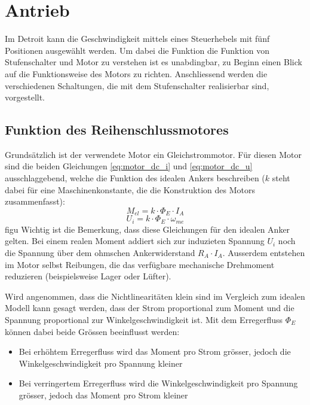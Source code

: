 \section{Antrieb}

Im Detroit kann die Geschwindigkeit mittels eines Steuerhebels mit fünf Positionen ausgewählt werden. Um dabei die Funktion die Funktion von Stufenschalter und Motor zu verstehen ist es unabdingbar, zu Beginn einen Blick auf die Funktionsweise des Motors zu richten. Anschliessend werden die verschiedenen Schaltungen, die mit dem Stufenschalter realisierbar sind, vorgestellt.

\subsection{Funktion des Reihenschlussmotores}\label{gm}

Grundsätzlich ist der verwendete Motor ein Gleichstrommotor. Für diesen Motor sind die beiden Gleichungen \ref{eq:motor_dc_i} und \ref{eq:motor_dc_u} ausschlaggebend, welche die Funktion des idealen Ankers beschreiben ($k$ steht dabei für eine Maschinenkonstante, die die Konstruktion des Motors zusammenfasst):
\begin{equation}
	M_{el}=k\cdot\Phi_E\cdot I_A
\label{eq:motor_dc_i}
\end{equation}
\begin{equation}
	U_i=k\cdot\Phi_E\cdot\omega_{me}
\label{eq:motor_dc_u}
\end{equation}figu
Wichtig ist die Bemerkung, dass diese Gleichungen für den idealen Anker gelten. Bei einem realen Moment addiert sich zur induzieten Spannung $U_i$ noch die Spannung über dem ohmschen Ankerwiderstand $R_A\cdot I_A$. Ausserdem entstehen im Motor selbst Reibungen, die das verfügbare mechanische Drehmoment reduzieren (beispielsweise Lager oder Lüfter).

Wird angenommen, dass die Nichtlinearitäten klein sind im Vergleich zum idealen Modell kann gesagt werden, dass der Strom proportional zum Moment und die Spannung proportional zur Winkelgeschwindigkeit ist. Mit dem Erregerfluss $\Phi_E$ können dabei beide Grössen beeinflusst werden: \begin{itemize}
	\item Bei erhöhtem Erregerfluss wird das Moment pro Strom grösser, jedoch die Winkelgeschwindigkeit pro Spannung kleiner
	\item Bei verringertem Erregerfluss wird die Winkelgeschwindigkeit pro Spannung grösser, jedoch das Moment pro Strom kleiner
\end{itemize}

